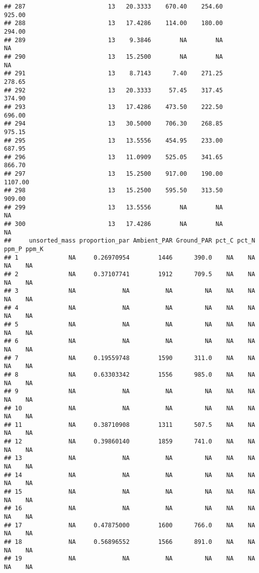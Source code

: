 \documentclass[]{article}
\begin{document}
\begin{verbatim}
## 287                       13   20.3333    670.40    254.60     925.00
## 288                       13   17.4286    114.00    180.00     294.00
## 289                       13    9.3846        NA        NA         NA
## 290                       13   15.2500        NA        NA         NA
## 291                       13    8.7143      7.40    271.25     278.65
## 292                       13   20.3333     57.45    317.45     374.90
## 293                       13   17.4286    473.50    222.50     696.00
## 294                       13   30.5000    706.30    268.85     975.15
## 295                       13   13.5556    454.95    233.00     687.95
## 296                       13   11.0909    525.05    341.65     866.70
## 297                       13   15.2500    917.00    190.00    1107.00
## 298                       13   15.2500    595.50    313.50     909.00
## 299                       13   13.5556        NA        NA         NA
## 300                       13   17.4286        NA        NA         NA
##     unsorted_mass proportion_par Ambient_PAR Ground_PAR pct_C pct_N ppm_P ppm_K
## 1              NA     0.26970954        1446      390.0    NA    NA    NA    NA
## 2              NA     0.37107741        1912      709.5    NA    NA    NA    NA
## 3              NA             NA          NA         NA    NA    NA    NA    NA
## 4              NA             NA          NA         NA    NA    NA    NA    NA
## 5              NA             NA          NA         NA    NA    NA    NA    NA
## 6              NA             NA          NA         NA    NA    NA    NA    NA
## 7              NA     0.19559748        1590      311.0    NA    NA    NA    NA
## 8              NA     0.63303342        1556      985.0    NA    NA    NA    NA
## 9              NA             NA          NA         NA    NA    NA    NA    NA
## 10             NA             NA          NA         NA    NA    NA    NA    NA
## 11             NA     0.38710908        1311      507.5    NA    NA    NA    NA
## 12             NA     0.39860140        1859      741.0    NA    NA    NA    NA
## 13             NA             NA          NA         NA    NA    NA    NA    NA
## 14             NA             NA          NA         NA    NA    NA    NA    NA
## 15             NA             NA          NA         NA    NA    NA    NA    NA
## 16             NA             NA          NA         NA    NA    NA    NA    NA
## 17             NA     0.47875000        1600      766.0    NA    NA    NA    NA
## 18             NA     0.56896552        1566      891.0    NA    NA    NA    NA
## 19             NA             NA          NA         NA    NA    NA    NA    NA

\end{verbatim}
\end{document}
